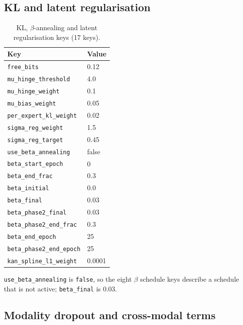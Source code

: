 \subsection{KL and latent regularisation}
\label{subsec:appb_kl}

\begin{table}[htbp]
\centering
\caption{KL, $\beta$-annealing and latent regularisation keys (17 keys).}
\label{tab:appb_kl}
\begin{tabular}{@{}ll@{}}
\hline
Key & Value \\
\hline
\texttt{free\_bits} & 0.12 \\
\texttt{mu\_hinge\_threshold} & 4.0 \\
\texttt{mu\_hinge\_weight} & 0.1 \\
\texttt{mu\_bias\_weight} & 0.05 \\
\texttt{per\_expert\_kl\_weight} & 0.02 \\
\texttt{sigma\_reg\_weight} & 1.5 \\
\texttt{sigma\_reg\_target} & 0.45 \\
\texttt{use\_beta\_annealing} & false \\
\texttt{beta\_start\_epoch} & 0 \\
\texttt{beta\_end\_frac} & 0.3 \\
\texttt{beta\_initial} & 0.0 \\
\texttt{beta\_final} & 0.03 \\
\texttt{beta\_phase2\_final} & 0.03 \\
\texttt{beta\_phase2\_end\_frac} & 0.3 \\
\texttt{beta\_end\_epoch} & 25 \\
\texttt{beta\_phase2\_end\_epoch} & 25 \\
\texttt{kan\_spline\_l1\_weight} & 0.0001 \\
\hline
\end{tabular}
\end{table}

\texttt{use\_beta\_annealing} is \texttt{false}, so the eight $\beta$ schedule keys
describe a schedule that is not active; \texttt{beta\_final} is $0.03$.

\clearpage

\subsection{Modality dropout and cross-modal terms}
\label{subsec:appb_moddrop}

